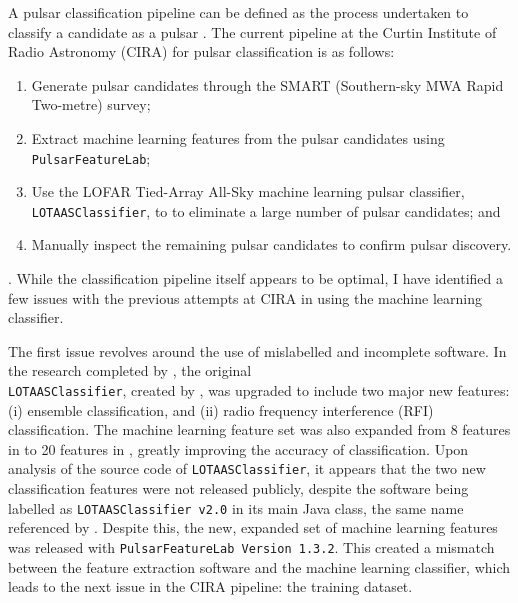 \documentclass{article}
\begin{document}
A pulsar classification pipeline can be defined as the process undertaken to classify a candidate as a pulsar \autocite{swainston}. The current pipeline at the Curtin Institute of Radio Astronomy (CIRA) for pulsar classification is as follows:
\begin{enumerate}[label=\roman*.]
    \item Generate pulsar candidates through the SMART (Southern-sky MWA Rapid Two-metre) survey;
    \item Extract machine learning features from the pulsar candidates using \\\verb|PulsarFeatureLab|;
    \item Use the LOFAR Tied-Array All-Sky machine learning pulsar classifier, \verb|LOTAASClassifier|, to to eliminate a large number of pulsar candidates; and
    \item Manually inspect the remaining pulsar candidates to confirm pulsar discovery.
\end{enumerate}
\autocite{swainston:git}. While the classification pipeline itself appears to be optimal, I have identified a few issues with the previous attempts at CIRA in using the machine learning classifier.

The first issue revolves around the use of mislabelled and incomplete software. In the research completed by \textcite{tan}, the original \\\verb|LOTAASClassifier|, created by \textcite{lyon}, was upgraded to include two major new features: (i) ensemble classification, and (ii) radio frequency interference (RFI) classification. The machine learning feature set was also expanded from 8 features in \textcite{lyon} to 20 features in \textcite{tan}, greatly improving the accuracy of classification. Upon analysis of the source code of \verb|LOTAASClassifier|, it appears that the two new classification features were not released publicly, despite the software being labelled as \verb|LOTAASClassifier v2.0| in its main Java class, the same name referenced by \textcite{tan}. Despite this, the new, expanded set of machine learning features was released with \verb|PulsarFeatureLab Version 1.3.2|. This created a mismatch between the feature extraction software and the machine learning classifier, which leads to the next issue in the CIRA pipeline: the training dataset.
\end{document}
